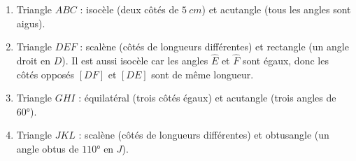 %
%
    \begin{enumerate}
        \item Triangle $ABC$ : isocèle (deux côtés de $\qty{5}{cm}$) et acutangle (tous les angles sont aigus).
        \item Triangle $DEF$ : scalène (côtés de longueurs différentes) et rectangle (un angle droit en $D$). Il est aussi isocèle car les angles $\widehat{E}$ et $\widehat{F}$ sont égaux, donc les côtés opposés $[DF]$ et $[DE]$ sont de même longueur.
        \item Triangle $GHI$ : équilatéral (trois côtés égaux) et acutangle (trois angles de $\ang{60}$).
        \item Triangle $JKL$ : scalène (côtés de longueurs différentes) et obtusangle (un angle obtus de $\ang{110}$ en $J$).
    \end{enumerate}
